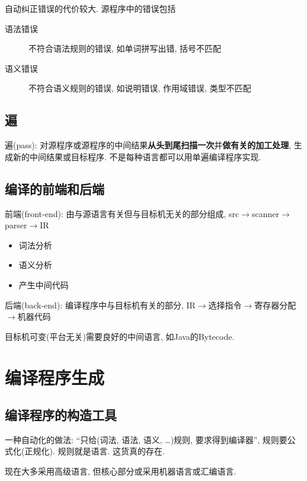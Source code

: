         自动纠正错误的代价较大. 源程序中的错误包括
        \begin{description}
            \item[语法错误] 不符合语法规则的错误, 如单词拼写出错, 括号不匹配
            \item[语义错误] 不符合语义规则的错误, 如说明错误, 作用域错误, 类型不匹配
        \end{description}

    \subsection{遍}

        \textsf{遍}(pass): 对源程序或源程序的中间结果\textbf{从头到尾扫描一次}并\textbf{做有关的加工处理}, 生成新的中间结果或目标程序. 不是每种语言都可以用单遍编译程序实现.

    \subsection{编译的前端和后端}

        \textsf{前端}(front-end): 由与源语言有关但与目标机无关的部分组成, src$\to$scanner$\to$parser$\to$IR

        \begin{itemize}
            \item 词法分析
            \item 语义分析
            \item 产生中间代码
        \end{itemize}

        \textsf{后端}(back-end): 编译程序中与目标机有关的部分, IR$\to$选择指令$\to$寄存器分配$\to$机器代码

        目标机可变(平台无关)需要良好的中间语言, 如Java的Bytecode.

\section{编译程序生成}

    \subsection{编译程序的构造工具}

        一种自动化的做法: ``只给(词法, 语法, 语义, \ldots)规则, 要求得到编译器'', 规则要公式化(正规化). 规则就是语言. 这货真的存在.

        现在大多采用高级语言, 但核心部分或采用机器语言或汇编语言.

